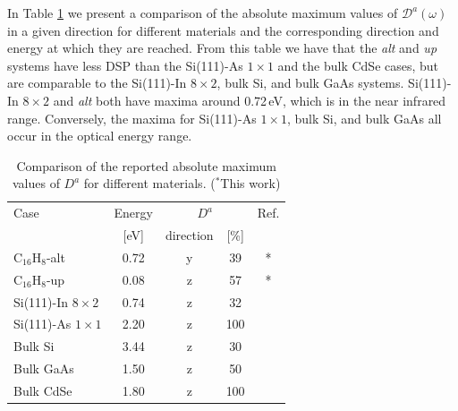 \documentclass[pss]{wiley2sp} %
\begin{document}
In Table \ref{tab:dacomp} we present a comparison of the absolute maximum
values of $\mathcal{D}^{a}(\omega)$ in a given direction for different
materials and the corresponding direction and energy at which they are
reached. From this table we have that the \emph{alt} and \emph{up} systems
have less DSP than the Si(111)-As $1\times1$ and the bulk CdSe cases, but are
comparable to the Si(111)-In $8\times2$, bulk Si, and bulk GaAs systems.
Si(111)-In $8\times2$ and \emph{alt} both have maxima around 0.72\,eV, which
is in the near infrared range. Conversely, the maxima for Si(111)-As
$1\times1$, bulk Si, and bulk GaAs all occur in the optical energy range.
\begin{table}[b]
\sidecaption
\begin{tabular}{lcccc}
\hline
\hline
Case & Energy &  \multicolumn{2}{c}{$D^{a}$} &  Ref.\\
\cline{3-4}   & [eV]   & direction & [\%] \\
\hline
C$_{16}$H$_{8}$-alt    & 0.72 & y & 39  & * \\
C$_{16}$H$_{8}$-up     & 0.08 & z & 57  & * \\
Si(111)-In $8\times2$  & 0.74 & z & 32  & \cite{arzatePRB14}\\
Si(111)-As $1\times1$  & 2.20 & z & 100 & \cite{mendozaPRB12}\\
Bulk Si                & 3.44 & z & 30  & \cite{nastosPRB07}\\
Bulk GaAs              & 1.50 & z & 50  & \cite{nastosPRB07,bhatPRB05}\\
Bulk CdSe              & 1.80 & z & 100 & \cite{nastosPRB07}\\
\hline
\hline
\end{tabular}
\caption[]{Comparison of the reported absolute maximum values of {$D^{a}$} for
different materials. ($^{*}$This work)}
\label{tab:dacomp}
\end{table}
\end{document}
